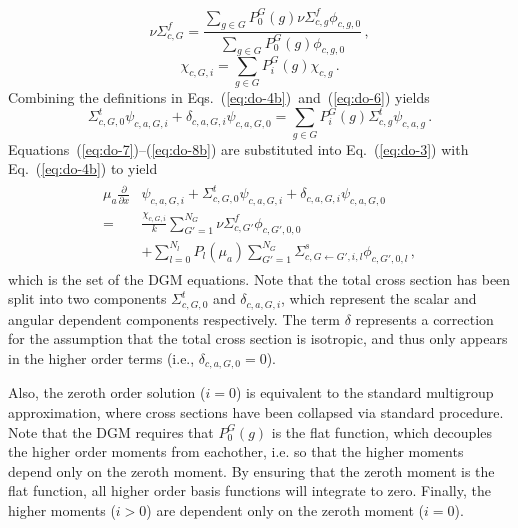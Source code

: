 \documentclass[5p,times,twocolumn,10pt]{elsarticle}
\newcommand{\EQ}[1]{Eq.~(\ref{#1})}               %
\newcommand{\EQUATIONS}[2]{Equations~(\ref{#1})--(\ref{#2})} %
\newcommand{\EQSTWO}[2]{Eqs.~(\ref{#1})~and~(\ref{#2})} %
\begin{document}
    \begin{equation}
        \nu\Sigma^f_{c,G}=\frac{\sum_{g\in G}P_0^G(g)\nu\Sigma^f_{c,g}\phi_{c,g,0}}
        {\sum_{g\in G}P_0^G(g)\phi_{c,g,0}}\, ,
    \end{equation}
    \begin{equation}
        \chi_{c,G,i} = \sum_{g\in G}P_i^G(g)\chi_{c,g}\, .
        \label{eq:chi}
    \end{equation}
    Combining the definitions in \EQSTWO{eq:do-4b}{eq:do-6} yields
    \begin{equation}
        \Sigma^t_{c,G,0}\psi_{c,a,G,i}
        +\delta_{c,a,G,i}\psi_{c,a,G,0}
        =\sum_{g\in G}P_i^G(g)\Sigma^t_{c, g}\psi_{c,a,g}\, .
        \label{eq:do-8b}
    \end{equation}
    \EQUATIONS{eq:do-7}{eq:do-8b} are substituted into \EQ{eq:do-3} with \EQ{eq:do-4b} to yield
    \begin{align}
        \begin{split}
            \mu_a\frac{\partial}{\partial x}&\psi_{c,a,G,i}
            +\Sigma^t_{c,G,0}\psi_{c,a,G,i}
            +\delta_{c,a,G,i}\psi_{c,a,G,0}\\
            =&\frac{\chi_{c,G,i}}{k}\sum_{G'=1}^{N_G}\nu\Sigma^f_{c,G'}\phi_{c,G',0,0}\\
            &+\sum_{l=0}^{N_l}P_l(\mu_a)\sum_{G'=1}^{N_G}\Sigma^s_{c,G\leftarrow G',i,l}\phi_{c,G',0,l}
            \, ,
            \label{eq:DGM}
        \end{split}
    \end{align}
    which is the set of the DGM equations.
    Note that the total cross section has been split into two components $\Sigma^t_{c,G,0}$ and $\delta_{c,a,G,i}$, which represent the scalar and angular dependent components respectively.
    The term $\delta$ represents a correction for the assumption that the total cross section is isotropic, and thus only appears in the higher order terms (i.e., $\delta_{c,a,G,0}=0$).

    Also, the zeroth order solution ($i=0$) is equivalent to the standard multigroup approximation, where cross sections have been collapsed via standard procedure.
    Note that the DGM requires that $P_0^G(g)$ is the flat function, which decouples the higher order moments from eachother, i.e. so that the higher moments depend only on the zeroth moment.
    By ensuring that the zeroth moment is the flat function, all higher order basis functions will integrate to zero.
    Finally, the higher moments ($i>0$) are dependent only on the zeroth moment ($i=0$).
\end{document}
